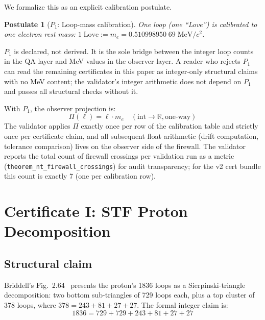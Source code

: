 \documentclass[12pt,a4paper]{article}
\newtheorem{postulate}{Postulate}
\begin{document}
We formalize this as an explicit calibration postulate.

\begin{postulate}[$P_1$: Loop-mass calibration]
One loop (one ``Love'') is calibrated to one electron rest mass:
$1\;\text{Love} := m_e = 0.510998950\;69\;\mathrm{MeV}/c^2$.
\end{postulate}

$P_1$ is declared, not derived. It is the sole bridge between the integer
loop counts in the QA layer and MeV values in the observer layer. A reader
who rejects $P_1$ can read the remaining certificates in this paper as
integer-only structural claims with no MeV content; the validator's
integer arithmetic does not depend on $P_1$ and passes all structural
checks without it.

With $P_1$, the observer projection is:
\begin{equation}
  \Pi(\ell) = \ell \cdot m_e \quad (\text{int} \to \mathbb{R}, \text{one-way})
\end{equation}
The validator applies $\Pi$ exactly once per row of the calibration
table and strictly once per certificate claim, and all subsequent
float arithmetic (drift computation, tolerance comparison) lives on
the observer side of the firewall. The validator reports the total
count of firewall crossings per validation run as a metric
(\texttt{theorem\_nt\_firewall\_crossings}) for audit transparency;
for the v2 cert bundle this count is exactly 7 (one per calibration
row).


\section{Certificate I: STF Proton Decomposition}
\label{sec:cert1}

\subsection{Structural claim}

Briddell's Fig.~2.64~\cite[p. 107]{briddellbook2020} presents the
proton's 1836 loops as a Sierpinski-triangle decomposition: two
bottom sub-triangles of 729 loops each, plus a top cluster of 378
loops, where $378 = 243 + 81 + 27 + 27$. The formal integer claim is:
\begin{equation}
  1836 = 729 + 729 + 243 + 81 + 27 + 27
\end{equation}
\end{document}
